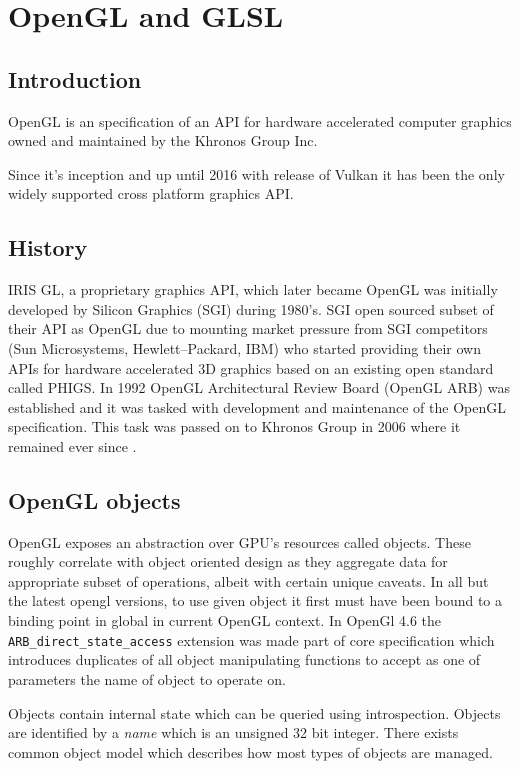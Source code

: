 \chapter{OpenGL and GLSL}

\section{Introduction}

OpenGL is an specification of an API for hardware accelerated computer graphics owned and maintained by the Khronos Group Inc.

Since it's inception  and up until 2016 with release of Vulkan it has been the only widely supported cross platform graphics API.

\section{History}

IRIS GL, a proprietary graphics API, which later became OpenGL was initially developed by Silicon Graphics (SGI) 
during 1980's. SGI open sourced subset of their API as OpenGL due to mounting market pressure from SGI competitors (Sun Microsystems, Hewlett--Packard, IBM) 
who started providing their own APIs for hardware accelerated 3D graphics based on an existing open standard called PHIGS.
In 1992 OpenGL Architectural Review Board (OpenGL ARB) was established and it was tasked with development and maintenance of the OpenGL specification. 
This task was passed on to Khronos Group in 2006 where it remained ever since \cite{irisglwiki} \cite{glwikip}.

\section{OpenGL objects}

OpenGL exposes an abstraction over GPU's resources called objects.
These roughly correlate with object oriented design as they aggregate data for appropriate subset of operations, albeit with certain unique caveats.
In all but the latest opengl versions, to use given object it first must have been bound to a binding point in global in current OpenGL context.
In OpenGl 4.6 the \texttt{ARB\_direct\_state\_access} extension was made part of core specification which introduces duplicates of all object manipulating functions to 
accept as one of parameters the name of object to operate on.

Objects contain internal state which can be queried using introspection. 
Objects are identified by a \textit{name} which is an unsigned 32 bit integer. 
There exists common object model which describes how most types of objects are managed.

